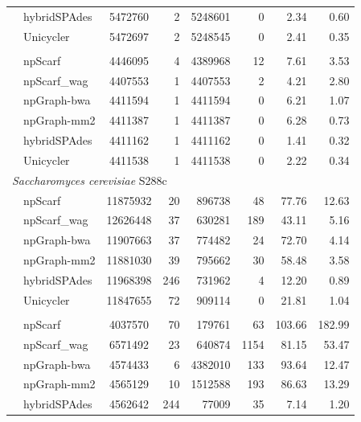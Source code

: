 \documentclass[10pt,twocolumn,twoside]{genpaper}
\begin{document}
\begin{longtable}[!hpt]{llcrrrrr}
& hybridSPAdes & 5472760  &  2  &  5248601  &  0  &  2.34 & 0.60\\*
& Unicycler & 5472697  & 2  & 5248545  &  0 & 2.41  &  0.35\\
\hline
\rowcolor{Gray}
\multicolumn{8}{l}{\emph{Mycobacterium tuberculosis} H37Rv} \\* %
\nobreakmidrule
\rowcolor{Gray}
& npScarf &  4446095 &  4  & 4389968   &  12  & 7.61  & 3.53\\*
\rowcolor{Gray}
& npScarf\_wag &  4407553 &  1  &  4407553  &  2  & 4.21  & 2.80\\*
\rowcolor{Gray}
& npGraph-bwa & 4411594  &  1  &  4411594  &  0  & 6.21  & 1.07\\*
\rowcolor{Gray}
& npGraph-mm2 & 4411387  & 1   &  4411387  &  0  & 6.28  & 0.73\\*
\rowcolor{Gray}
& hybridSPAdes & 4411162  &  1  &  4411162  &  0  &  1.41 &  0.32\\*
\rowcolor{Gray}
& Unicycler & 4411538  &  1  &  4411538  &  0  &  2.22 &  0.34\\
\hline
\multicolumn{8}{l}{\emph{Saccharomyces cerevisiae} S288c} \\* %
\nobreakmidrule
& npScarf &  11875932 &  20  &  896738  &  48  &  77.76 & 12.63 \\*
& npScarf\_wag & 12626448  &  37  &  630281  &  189  & 43.11  & 5.16 \\*
& npGraph-bwa & 11907663  &  37  &  774482  &  24 &  72.70 &  4.14\\*
& npGraph-mm2 & 11881030  &  39  &  795662  &  30 &  58.48 &  3.58\\*
& hybridSPAdes &  11968398 &  246  &  731962  &  4  & 12.20  & 0.89\\*
& Unicycler &  11847655 & 72  & 909114  &  0 & 21.81  &  1.04\\
\hline
\rowcolor{Gray}
\multicolumn{8}{l}{\emph{Shigella dysenteriae}  Sd197} \\* %
\nobreakmidrule
\rowcolor{Gray}
& npScarf &  4037570 &  70  & 179761   &  63  & 103.66  & 182.99\\*
\rowcolor{Gray}
& npScarf\_wag & 6571492  &  23  &  640874  &  1154  &  81.15 & 53.47\\*
\rowcolor{Gray}
& npGraph-bwa & 4574433  &  6  &  4382010  &  133  & 93.64  & 12.47\\*
\rowcolor{Gray}
& npGraph-mm2 & 4565129  &  10  &  1512588  &  193  & 86.63  & 13.29\\*
\rowcolor{Gray}
& hybridSPAdes &  4562642 & 244   &  77009  & 35   & 7.14  &  1.20\\*

\end{longtable}
\end{document}
